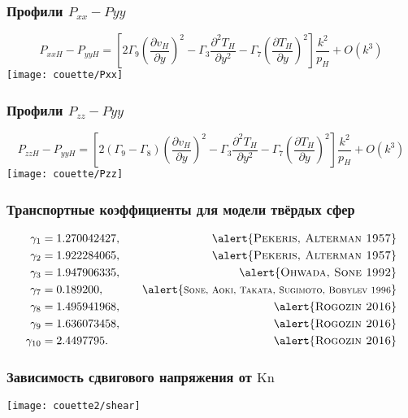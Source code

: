 \documentclass[mathserif]{beamer} %
\newcommand{\Kn}{\mathrm{Kn}}
\newcommand{\pder}[2][]{\frac{\partial#1}{\partial#2}}
\newcommand{\pderdual}[2][]{\frac{\partial^2#1}{\partial#2^2}}
\newcommand{\OO}[1]{O(#1)}
\newcommand{\Cite}[2][]{\alert{\textsc{#2 #1}}}
\begin{document}
\begin{frame}
    \frametitle{Профили \(P_{xx}-P{yy}\)}
    \vspace{-15pt}
    \[ P_{xxH}-P_{yyH} = \left[ 2\Gamma_9 \left(\pder[v_H]{y}\right)^2
        - \Gamma_3 \pderdual[T_H]{y}
        - \Gamma_7\left(\pder[T_H]{y}\right)^2 \right]\frac{k^2}{p_H} + \OO{k^3} \]
    \vspace{-15pt}
    \centering
    \texttt{[image: couette/Pxx]}
\end{frame}

\begin{frame}
    \frametitle{Профили \(P_{zz}-P{yy}\)}
    \footnotesize
    \vspace{-15pt}
    \[ P_{zzH}-P_{yyH} = \left[ 2(\Gamma_9-\Gamma_8) \left(\pder[v_H]{y}\right)^2
        - \Gamma_3 \pderdual[T_H]{y}
        - \Gamma_7\left(\pder[T_H]{y}\right)^2 \right]\frac{k^2}{p_H} + \OO{k^3} \]
    \vspace{-15pt}
    \centering
    \texttt{[image: couette/Pzz]}
\end{frame}

\begin{frame}
    \frametitle{Транспортные коэффициенты для модели твёрдых сфер}
    \begin{alignat*}{2}
        \gamma_1 &= 1.270042427, \quad &\text{\Cite[1957]{Pekeris, Alterman}} \\
        \gamma_2 &= 1.922284065, \quad &\text{\Cite[1957]{Pekeris, Alterman}} \\
        \gamma_3 &= 1.947906335, \quad &\text{\Cite[1992]{Ohwada, Sone}} \\
        \gamma_7 &= 0.189200,    \quad &\text{\Cite[1996]{\footnotesize Sone, Aoki, Takata, Sugimoto, Bobylev}} \\
        \gamma_8 &= 1.495941968, \quad &\text{\Cite[2016]{Rogozin}} \\
        \gamma_9 &= 1.636073458, \quad &\text{\Cite[2016]{Rogozin}} \\
        \gamma_{10} &= 2.4497795.\quad &\text{\Cite[2016]{Rogozin}}
    \end{alignat*}
\end{frame}

\begin{frame}
    \frametitle{Зависимость сдвигового напряжения от \(\Kn\)}
    \vspace{-2pt}
    \centering\hspace{-1.5cm}
    \texttt{[image: couette2/shear]}
    \hspace{-1.5cm}
\end{frame}
\end{document}
